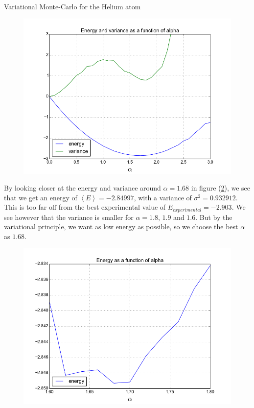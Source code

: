 \documentclass[a4paper, 12pt, titlepage]{article}
\begin{document}
\begin{section}{Variational Monte-Carlo for the Helium atom}
 \begin{figure}[H]
 	\centering
 	\includegraphics[width=\textwidth]{../python_programs/EnergyVariance_helium1.png}
 	\label{Helium1}
 \end{figure}

 By looking closer at the energy and variance around $\alpha = 1.68$ in figure (\ref{Helium2}), we see that we get an energy of $\left<E\right> = -2.84997$, with a variance of $\sigma ^2 = 0.932912$. This is too far off from the best experimental value of $E_{experimental} = -2.903$. We see however that the variance is smaller for $\alpha = 1.8$, $1.9$ and $1.6$. But by the variational principle, we want as low energy as possible, so we choose the best $\alpha$ as $1.68$. 
 
 \begin{figure}[H]
 	\centering
 	\includegraphics[width=\textwidth]{../python_programs/EnergyVariance_helium2.png}
 	\label{Helium2}
 \end{figure}

\end{section}
\end{document}
